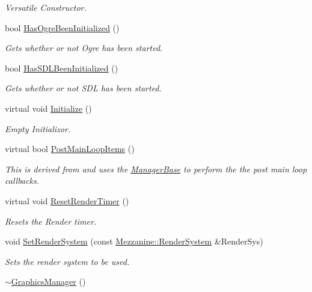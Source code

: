 \begin{DoxyCompactItemize}
\begin{DoxyCompactList}\small\item\em Versatile Constructor. \item\end{DoxyCompactList}\item 
bool \hyperlink{classMezzanine_1_1GraphicsManager_ad440eb301b479b7b1e387dc08e7d5444}{HasOgreBeenInitialized} ()
\begin{DoxyCompactList}\small\item\em Gets whether or not Ogre has been started. \item\end{DoxyCompactList}\item 
bool \hyperlink{classMezzanine_1_1GraphicsManager_a952bc45c1efc78c2508e81f38fe5527d}{HasSDLBeenInitialized} ()
\begin{DoxyCompactList}\small\item\em Gets whether or not SDL has been started. \item\end{DoxyCompactList}\item 
virtual void \hyperlink{classMezzanine_1_1GraphicsManager_a4f76a6a37be800b1fc13195aa11cfd7a}{Initialize} ()
\begin{DoxyCompactList}\small\item\em Empty Initializor. \item\end{DoxyCompactList}\item 
virtual bool \hyperlink{classMezzanine_1_1GraphicsManager_a73d12091631749914d4a1025c45d68b4}{PostMainLoopItems} ()
\begin{DoxyCompactList}\small\item\em This is derived from and uses the \hyperlink{classMezzanine_1_1ManagerBase}{ManagerBase} to perform the the post main loop callbacks. \item\end{DoxyCompactList}\item 
virtual void \hyperlink{classMezzanine_1_1GraphicsManager_adf7b2ba6879fdde8d00d3a6899b32fcc}{ResetRenderTimer} ()
\begin{DoxyCompactList}\small\item\em Resets the Render timer. \item\end{DoxyCompactList}\item 
void \hyperlink{classMezzanine_1_1GraphicsManager_ae110dcf1ddad03c6ef14b2cc2d06f5b8}{SetRenderSystem} (const \hyperlink{namespaceMezzanine_a1bb0347c37954bc71c4344e4b55c729a}{Mezzanine::RenderSystem} \&RenderSys)
\begin{DoxyCompactList}\small\item\em Sets the render system to be used. \item\end{DoxyCompactList}\item 
\hypertarget{classMezzanine_1_1GraphicsManager_ac100c1868c93e0cbb5f8395de5f21687}{
\hyperlink{classMezzanine_1_1GraphicsManager_ac100c1868c93e0cbb5f8395de5f21687}{$\sim$GraphicsManager} ()}
\label{classMezzanine_1_1GraphicsManager_ac100c1868c93e0cbb5f8395de5f21687}


\end{DoxyCompactItemize}
